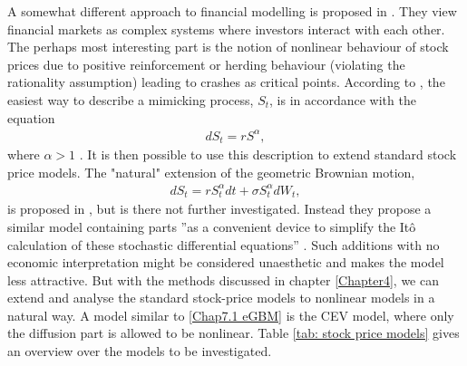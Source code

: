 A somewhat different approach to financial modelling is proposed in \citet{johansen2000crashes, sornette2002nonlinear, lin2009consistent}.
They view financial markets as complex systems where investors interact with each other.
The perhaps most interesting part is the notion of nonlinear behaviour of stock prices due to positive reinforcement or herding behaviour (violating the rationality assumption) leading to crashes as critical points.
According to \citet{johansen2000crashes}, the easiest way to describe a mimicking process, $S_t$, is in accordance with the equation 
\begin{align}
dS_t=rS^\alpha,
\end{align}
where $\alpha>1$ \citep{johansen2000crashes}.
It is then possible to use this description to extend standard stock price models.
The "natural" extension of the geometric Brownian motion,
\begin{align}\label{Chap7.1 eGBM}
dS_t = rS_t^\alpha dt + \sigma S_t^\alpha dW_t,
\end{align}
is proposed in \citet{sornette2002nonlinear}, but is there not further investigated.
Instead they propose a similar model containing parts ”as a convenient device to simplify the Itô calculation of these stochastic differential equations” \citep{sornette2002nonlinear}.
Such additions with no economic interpretation might be considered unaesthetic and makes the model less attractive.
But with the methods discussed in chapter \ref{Chapter4}, we can extend and analyse the standard stock-price models to nonlinear models in a natural way.
A model similar to \eqref{Chap7.1 eGBM} is the CEV model, where only the diffusion part is allowed to be nonlinear.
Table \ref{tab: stock price models} gives an overview over the models to be investigated.


